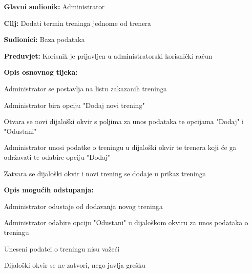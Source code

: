 		\noindent {}
		\begin{packed_item}
			
			\item \textbf{Glavni sudionik: } Administrator
			\item  \textbf{Cilj: } Dodati termin treninga jednome od trenera
			\item  \textbf{Sudionici: } Baza podataka
			\item  \textbf{Preduvjet: } Korisnik je prijavljen u administratorski korisnički račun
			\item  \textbf{Opis osnovnog tijeka:}
			
			\item[] \begin{packed_enum}
				
				\item Administrator se postavlja na listu zakazanih treninga
				\item Administrator bira opciju "Dodaj novi trening"
				\item Otvara se novi dijaloški okvir s poljima za unos podataka te opcijama "Dodaj" i "Odustani"
				\item Administrator unosi podatke o treningu u dijaloški okvir te trenera koji će ga održavati te odabire opciju "Dodaj"
				\item Zatvara se dijaloški okvir i novi trening se dodaje u prikaz treninga
			\end{packed_enum}
			
			\item  \textbf{Opis mogućih odstupanja:}
			
			\item[] \begin{packed_item}
				
				\item[3.a] Administrator odustaje od dodavanja novog treninga
				\item[] \begin{packed_enum}
					
					\item Administrator odabire opciju "Odustani" u dijaloškom okviru za unos podataka o treningu
					
				\end{packed_enum}
				\item[3.b] Uneseni podatci o treningu nisu važeći
				\item[] \begin{packed_enum}
					
					\item Dijaloški okvir se ne zatvori, nego javlja grešku
					
				\end{packed_enum}
			\end{packed_item}
			
		\end{packed_item}
	
